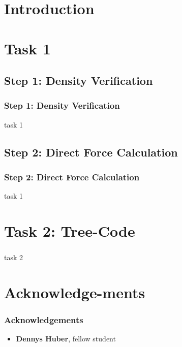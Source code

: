 
\section{Introduction} %

\section{Task 1}
\subsection{Step 1: Density Verification}
\begin{frame}
	\frametitle{Step 1: Density Verification}
	task 1
\end{frame}

\subsection{Step 2: Direct Force Calculation}
\begin{frame}
	\frametitle{Step 2: Direct Force Calculation}
	task 1
\end{frame}

\section{Task 2: Tree-Code}
\begin{frame}
	\frametitle{}
	task 2
\end{frame}

\section{Acknowledge-\newline ments}
\begin{frame}
	\frametitle{Acknowledgements}
	\begin{itemize}
		\item \textbf{Dennys Huber}, fellow student
	\end{itemize}
\end{frame}

